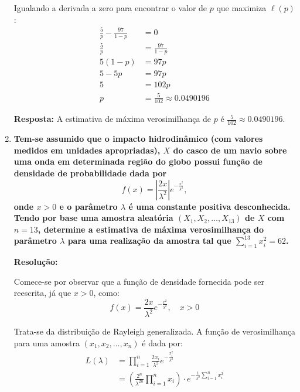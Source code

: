 \documentclass[a4paper,12pt]{article}
\begin{document}
\begin{enumerate}
\begin{mdframed}[backgroundcolor=gray!10, linewidth=0pt, innertopmargin=10pt, innerbottommargin=10pt]
    Igualando a derivada a zero para encontrar o valor de $p$ que maximiza $\ell(p)$:
    \begin{align*}
    \frac{5}{p} - \frac{97}{1-p} &= 0 \\
    \frac{5}{p} &= \frac{97}{1-p} \\
    5(1-p) &= 97p \\
    5 - 5p &= 97p \\
    5 &= 102p \\
    p &= \frac{5}{102} \approx 0.0490196
    \end{align*}

    \textbf{Resposta:} A estimativa de máxima verosimilhança de $p$ é $\frac{5}{102} \approx 0.0490196$.
    \end{mdframed}

    \vspace{0.5cm}

    \item \textbf{Tem-se assumido que o impacto hidrodinâmico (com valores medidos em unidades apropriadas), \( X \) do casco de um navio sobre uma onda em determinada região do globo possui função de densidade de probabilidade dada por}
    \[
    f(x) = \left| \frac{2x}{\lambda^2} \right| e^{-\frac{x^2}{\lambda^2}},
    \]
    \textbf{onde \( x > 0 \) e o parâmetro \( \lambda \) é uma constante positiva desconhecida. Tendo por base uma amostra aleatória \( (X_1, X_2, \ldots, X_{13}) \) de \( X \) com \( n = 13 \), determine a estimativa de máxima verosimilhança do parâmetro \( \lambda \) para uma realização da amostra tal que \( \sum_{i=1}^{13} x_i^2 = 62 \).}

    \vspace{0.3cm}

    \begin{mdframed}[backgroundcolor=gray!10, linewidth=0pt, innertopmargin=10pt, innerbottommargin=10pt]
    \textbf{Resolução:}

    Comece-se por observar que a função de densidade fornecida pode ser reescrita, já que \( x > 0 \), como:
    \[
    f(x) = \frac{2x}{\lambda^2} e^{-\frac{x^2}{\lambda^2}}, \quad x > 0
    \]

    Trata-se da distribuição de Rayleigh generalizada. A função de verosimilhança para uma amostra \( (x_1, x_2, \ldots, x_n) \) é dada por:
    \begin{align*}
    L(\lambda) &= \prod_{i=1}^n \frac{2x_i}{\lambda^2} e^{-\frac{x_i^2}{\lambda^2}} \\
    &= \left( \frac{2^n}{\lambda^{2n}} \prod_{i=1}^n x_i \right) \cdot e^{-\frac{1}{\lambda^2} \sum_{i=1}^n x_i^2}
    \end{align*}


\end{mdframed}
\end{enumerate}
\end{document}
